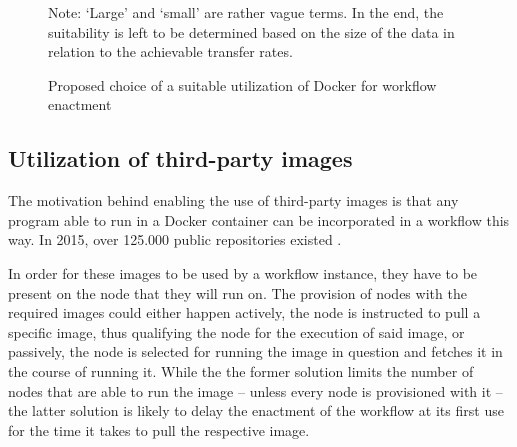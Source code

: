   \begin{figure}[htbp]
    \centering
    \newdimen\nodeDist
    \nodeDist=35mm
    \caption*{\scriptsize Note: `Large' and `small' are rather vague terms. In the end, the suitability is left to be determined based on the size of the data in relation to the achievable transfer rates.}
    \caption{Proposed choice of a suitable utilization of Docker for workflow enactment}
    \label{fig:choosing_docker_utilization}
  \end{figure}

\subsection{Utilization of third-party images} %
\label{sub:execution_of_third_party_containers}
  The motivation behind enabling the use of third-party images is that any program able to run in a Docker container can be incorporated in a workflow this way. In 2015, over 125.000 public repositories existed \cite{Dehamer2015Docker}.

  In order for these images to be used by a workflow instance, they have to be present on the node that they will run on. The provision of nodes with the required images could either happen actively, \ie the node is instructed to pull a specific image, thus qualifying the node for the execution of said image, or passively, \ie the node is selected for running the image in question and fetches it in the course of running it. While the the former solution limits the number of nodes that are able to run the image -- unless every node is provisioned with it -- the latter solution is likely to delay the enactment of the workflow at its first use for the time it takes to pull the respective image.

